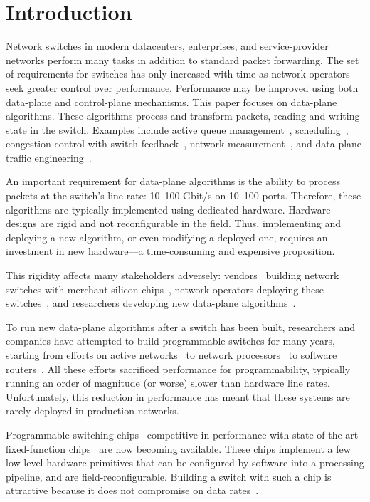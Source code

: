 \pagebreak
\section{Introduction}
\label{s:intro}
Network switches in modern datacenters, enterprises, and service-provider
networks perform many tasks in addition to standard packet forwarding. The set
of requirements for switches has only increased with time as network operators
seek greater control over performance.  Performance may be improved using both
data-plane and control-plane mechanisms. This paper focuses on data-plane
algorithms. These algorithms process and transform packets, reading and
writing state in the switch. Examples include active queue
management~\cite{red,avq,codel}, scheduling~\cite{pifo_hotnets}, congestion
control with switch feedback~\cite{xcp, rcp}, network
measurement~\cite{opensketch, bitmap_george}, and data-plane traffic
engineering~\cite{conga}.

An important requirement for data-plane algorithms is the ability to process
packets at the switch's line rate: 10--100 Gbit/s on 10--100 ports.  Therefore,
these algorithms are typically implemented using dedicated hardware.  Hardware
designs are rigid and not reconfigurable in the field. Thus, implementing and
deploying a new algorithm, or even modifying a deployed one, requires an
investment in new hardware---a time-consuming and expensive proposition.

This rigidity affects many stakeholders adversely: vendors~\cite{cisco_nexus,
dell_force10, arista_7050} building network switches with merchant-silicon
chips~\cite{trident, tomahawk, mellanox}, network operators deploying these
switches~\cite{google,facebook,vl2}, and researchers developing new data-plane
algorithms~\cite{rcp, conga, xcp, bitmap_george}.

To run new data-plane algorithms after a switch has been built, researchers and
companies have attempted to build programmable switches for many years,
starting from efforts on active networks~\cite{active-nets} to network
processors~\cite{ixp4xx} to software routers~\cite{click, dpdk}. All these
efforts sacrificed performance for programmability, typically running an order
of magnitude (or worse) slower than hardware line rates. Unfortunately, this
reduction in performance has meant that these systems are rarely deployed in
production networks.

Programmable switching chips~\cite{flexpipe, xpliant, tofino} competitive in
performance with state-of-the-art fixed-function chips~\cite{trident,
tomahawk, mellanox} are now becoming available. These chips implement a few
low-level hardware primitives that can be configured by software into a
processing pipeline, and are field-reconfigurable. Building a switch with such
a chip is attractive because it does not compromise on data rates~\cite{rmt}.

